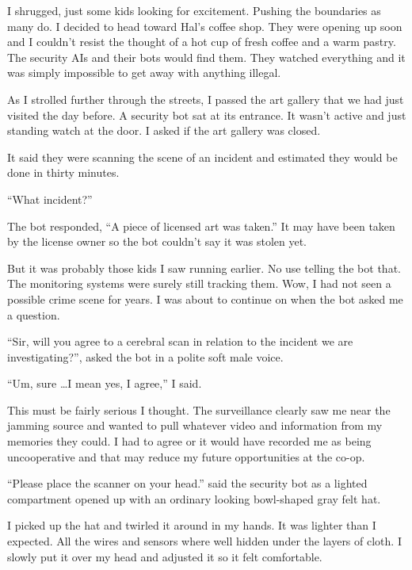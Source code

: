 I shrugged, just some kids looking for excitement.  Pushing the
boundaries as many do. I decided to head toward Hal's coffee
shop. They were opening up soon and I couldn't resist the
thought of a hot cup of fresh coffee and a warm pastry. The
security AIs and their bots would find them.  They watched
everything and it was simply impossible to get
away with anything illegal.

As I strolled further through the streets, I passed the art
gallery that we had just visited the day before. A security bot
sat at its entrance. It wasn't active and just standing
watch at the door. I asked if the art gallery was closed.

It said they were scanning the scene of an incident and
estimated they would be done in thirty minutes.

``What incident?''

The bot responded, ``A piece of licensed art was taken.'' It may
have been taken by the license owner so the bot couldn't say it
was stolen yet.

But it was probably those kids I saw running earlier. No use
telling the bot that. The monitoring systems were surely still
tracking them. Wow, I had not seen a possible crime scene for
years. I was about to continue on when the bot asked me a
question.

``Sir, will you agree to a cerebral scan in relation to
the incident we are investigating?'', asked the bot in a polite
soft male voice.

``Um, sure \ldots I mean yes, I agree,'' I said.

This must be fairly serious I thought. The surveillance clearly
saw me near the jamming source and wanted to pull whatever video
and information from my memories they could. I had to agree or
it would have recorded me as being uncooperative and that may
reduce my future opportunities at the co-op.

``Please place the scanner on your head.'' said the
security bot as a lighted compartment opened up with an ordinary
looking bowl-shaped gray felt hat.

I picked up the hat and twirled it around in my hands. It was
lighter than I expected.  All the wires and sensors
where well hidden under the layers of cloth. I slowly put it
over my head and adjusted it so it felt comfortable.

